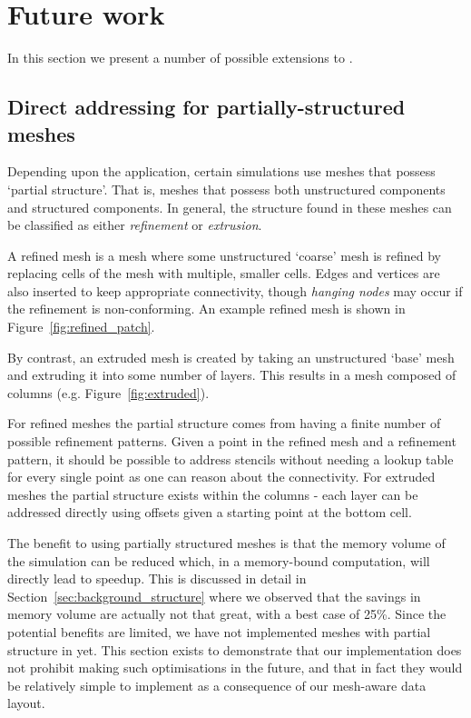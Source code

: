 \section{Future work}
\label{sec:future}

In this section we present a number of possible extensions to .

\subsection{Direct addressing for partially-structured meshes}
\label{sec:future_partialstructure}

Depending upon the application, certain simulations use meshes that possess `partial structure'.
That is, meshes that possess both unstructured components and structured components.
In general, the structure found in these meshes can be classified as either \textit{refinement} or \textit{extrusion}.

A refined mesh is a mesh where some unstructured `coarse' mesh is refined by replacing cells of the mesh with multiple, smaller cells.
Edges and vertices are also inserted to keep appropriate connectivity, though \textit{hanging nodes} may occur if the refinement is non-conforming.
An example refined mesh is shown in Figure~\ref{fig:refined_patch}.

By contrast, an extruded mesh is created by taking an unstructured `base' mesh and extruding it into some number of layers.
This results in a mesh composed of columns (e.g. Figure~\ref{fig:extruded}).

For refined meshes the partial structure comes from having a finite number of possible refinement patterns.
Given a point in the refined mesh and a refinement pattern, it should be possible to address stencils without needing a lookup table for every single point as one can reason about the connectivity.
For extruded meshes the partial structure exists within the columns - each layer can be addressed directly using offsets given a starting point at the bottom cell.

The benefit to using partially structured meshes is that the memory volume of the simulation can be reduced which, in a memory-bound computation, will directly lead to speedup.
This is discussed in detail in Section~\ref{sec:background_structure} where we observed that the savings in memory volume are actually not that great, with a best case of 25\%.
Since the potential benefits are limited, we have not implemented meshes with partial structure in  yet.
This section exists to demonstrate that our implementation does not prohibit making such optimisations in the future, and that in fact they would be relatively simple to implement as a consequence of our mesh-aware data layout.

